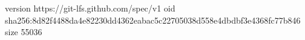 version https://git-lfs.github.com/spec/v1
oid sha256:8d82f4488da4e82230dd4362eabac5c22705038d558e4dbdbf3e4368fc77b846
size 55036
